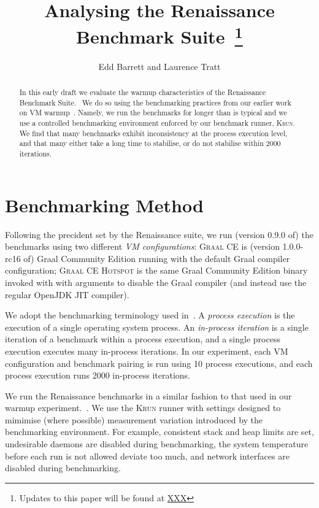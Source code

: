 \documentclass[a4paper]{article}
\newcommand{\krun}{\textsc{Krun}\xspace}
\newcommand{\graalce}{\textsc{Graal CE}\xspace}
\newcommand{\graalcehs}{\textsc{Graal CE Hotspot}\xspace}
\begin{document}
\title{Analysing the Renaissance Benchmark Suite~\footnote{Updates to this paper will be found at \url{XXX}}}

\author{Edd Barrett and Laurence Tratt}

\maketitle

\begin{abstract}
\noindent In this early draft we evaluate the warmup characteristics of the
Renaissance Benchmark Suite.~\cite{prokopec19renaissance} We do so using the
benchmarking practices from our earlier work on VM
warmup~\cite{barrett16warmup}. Namely, we run the benchmarks for longer than is
typical and we use a controlled benchmarking environment enforced by our
benchmark runner, \krun. We find that many benchmarks exhibit inconsistency at
the process execution level, and that many either take a long time to
stabilise, or do not stabilise within 2000 iterations.
\end{abstract}

\section{Benchmarking Method}
\label{sec:eval}

Following the precident set by the Renaissance suite, we run (version 0.9.0 of)
the benchmarks using two different \emph{VM configurations}: \graalce is
(version 1.0.0-rc16 of) Graal Community Edition running with the default Graal
compiler configuration; \graalcehs is the same Graal Community Edition binary
invoked with with arguments to disable the Graal compiler (and instead use the
regular OpenJDK JIT compiler).

We adopt the benchmarking terminology used in~\cite{barrett16warmup}. A
\emph{process execution} is the execution of a single operating system process.
An \emph{in-process iteration} is a single iteration of a benchmark within a
process execution, and a single process execution executes many in-process
iterations. In our experiment, each VM configuration and benchmark pairing is
run using 10 process executions, and each process execution runs 2000
in-process iterations.

We run the Renaissance benchmarks in a similar fashion to that used in our
warmup experiment.~\cite{barrett16warmup}. We use the \krun runner with
settings designed to mimimise (where possible) measurement variation introduced
by the benchmarking environment. For example, consistent stack and heap limits
are set, undesirable daemons are disabled during benchmarking, the system
temperature before each run is not allowed deviate too much, and network
interfaces are disabled during benchmarking.
\end{document}
